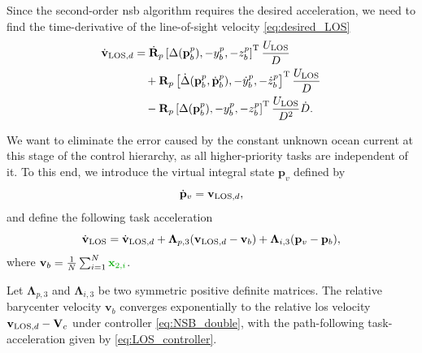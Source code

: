 Since the second-order \gls{nsb} algorithm requires the desired acceleration, we need to find the time-derivative of the line-of-sight velocity \eqref{eq:desired_LOS}
\begin{equation}\label{eq:desired_LOS_derivative}
\begin{split}
        \dot{\mathbf{v}}_{{\rm LOS}, d} &= \dot{\mathbf{R}}_p\left[ \Delta(\mathbf{p}_b^p), -y_b^p, -z_b^p \right]^{\mathrm{T}} \frac{U_{\rm LOS}}{D} \\ & \quad + \mathbf{R}_p \left[ \dot{\Delta}(\mathbf{p}_b^p, \dot{\mathbf{p}}_b^p), -\dot{y}_b^p, -\dot{z}_b^p \right]^{\mathrm{T}} \frac{U_{\rm LOS}}{D}\\ & \quad - \mathbf{R}_p \left[ \Delta(\mathbf{p}_b^p), -y_b^p, -z_b^p \right]^{\mathrm{T}} \frac{U_{\rm LOS}}{D^2}\dot{D}.
    \end{split}
\end{equation}

We want to eliminate the error caused by the constant unknown ocean current at this stage of the control hierarchy, as all higher-priority tasks are independent of it. To this end, we introduce the virtual integral state $\mathbf{p}_v$ defined by
\begin{equation}\label{eq:los_integral_state}
    \dot{\mathbf{p}}_v = \mathbf{v}_{{\rm LOS}, d},
\end{equation}
and define the following task acceleration
\begin{equation} \label{eq:LOS_controller}
    \dot{\mathbf{v}}_{\rm LOS} = \dot{\mathbf{v}}_{{\rm LOS}, d} + \mathbf{\Lambda}_{p,3} (\mathbf{v}_{{\rm LOS}, d} - \mathbf{v}_b) + \mathbf{\Lambda}_{i,3} (\mathbf{p}_v-\mathbf{p}_b),
\end{equation}
where $\mathbf{v}_b = \tfrac{1}{N} \sum_{i=1}^N \dm{\mathbf{x}_{2,i}}$.

\begin{lemma}\label{lemma:LOS_controller}
    Let $\bm{\Lambda}_{p,3}$ and $\bm{\Lambda}_{i,3}$ be two symmetric positive definite matrices. The relative barycenter velocity $\mathbf{v}_b$ converges exponentially to the relative \gls{los} velocity $\mathbf{v}_{{\rm LOS}, d}-\mathbf{V}_c$ under controller \eqref{eq:NSB_double}, with the path-following task-acceleration given by \eqref{eq:LOS_controller}.
\end{lemma}

